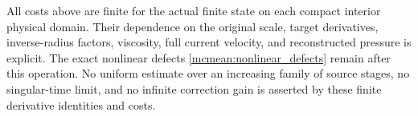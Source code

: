 \documentclass[11pt]{article}
\begin{document}
All costs above are finite for the actual finite state on each compact
interior physical domain. Their dependence on the original scale,
target derivatives, inverse-radius factors, viscosity, full current
velocity, and reconstructed pressure is explicit. The exact nonlinear
defects \eqref{mcmean:nonlinear_defects} remain after this operation.
No uniform estimate over an increasing family of source stages,
no singular-time limit, and no infinite correction gain is asserted
by these finite derivative identities and costs.
\end{document}
